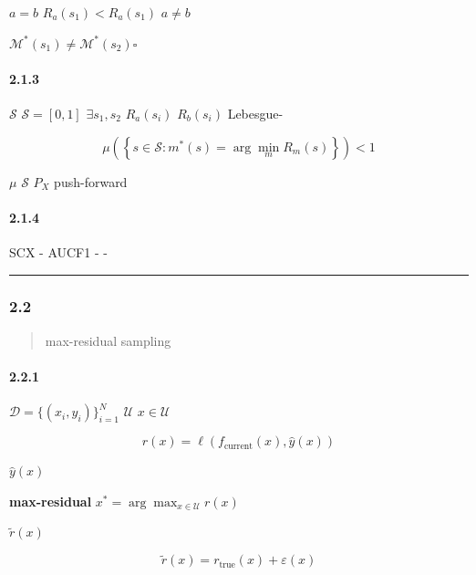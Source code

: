 \documentclass[
  12pt,
]{article}
\begin{document}
 \(a = b\) \(R_a(s_1) < R_a(s_1)\) \(a \neq b\)


\(\mathcal{M}^*(s_1) \neq \mathcal{M}^*(s_2)\)\(\square\)

\paragraph{2.1.3
}\label{ux63a8ux5e7fux8fdeux7eedux72b6ux6001ux4e0bux7684ux9000ux5316ux5f62ux5f0f}

 \(\mathcal{S}\)  \(\mathcal{S} = [0,1]\)
\(\exists s_1, s_2\)  \(R_a(s_i)\)  \(R_b(s_i)\) 
Lebesgue-

\[\mu\left(\left\{s \in \mathcal{S} : m^*(s) = \arg\min_m R_m(s)\right\}\right) < 1\]

 \(\mu\)  \(\mathcal{S}\)  \(P_X\) 
push-forward

\paragraph{2.1.4 }\label{ux5b9eux8bc1ux542bux4e49}

 SCX \textbf{} -
 AUCF1  -
 -


\begin{center}\rule{0.5\linewidth}{0.5pt}\end{center}

\subsubsection{2.2
}\label{ux547dux9898ux4e8cux9ad8ux8befux5deeux91c7ux6837ux5728ux566aux58f0ux4e0bux975eux6700ux4f18}

\begin{quote}
\textbf{}max-residual
sampling
\end{quote}

\paragraph{2.2.1 }\label{ux95eeux9898ux5f62ux5f0fux5316}

 \(\mathcal{D} = \{(x_i, y_i)\}_{i=1}^N\) 
\(\mathcal{U}\) \(x \in \mathcal{U}\)

\[r(x) = \ell(f_{\text{current}}(x), \hat{y}(x))\]

 \(\hat{y}(x)\) 

\textbf{max-residual }\(x^* = \arg\max_{x \in \mathcal{U}} r(x)\)

\textbf{} \(\tilde{r}(x)\) 

\[\tilde{r}(x) = r_{\text{true}}(x) + \varepsilon(x)\]
\end{document}
